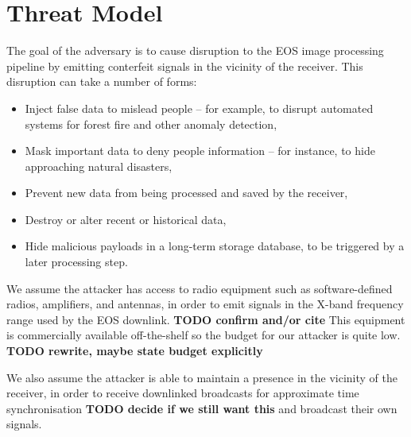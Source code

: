 \section{Threat Model}

The goal of the adversary is to cause disruption to the EOS image processing pipeline by emitting conterfeit signals in the vicinity of the receiver.
This disruption can take a number of forms:
\begin{itemize}
    \item Inject false data to mislead people -- for example, to disrupt automated systems for forest fire and other anomaly detection,
    \item Mask important data to deny people information -- for instance, to hide approaching natural disasters,
    \item Prevent new data from being processed and saved by the receiver,
    \item Destroy or alter recent or historical data,
    \item Hide malicious payloads in a long-term storage database, to be triggered by a later processing step.
\end{itemize}

We assume the attacker has access to radio equipment such as software-defined radios, amplifiers, and antennas, in order to emit signals in the X-band frequency range used by the EOS downlink.
\textbf{TODO confirm and/or cite}
This equipment is commercially available off-the-shelf so the budget for our attacker is quite low.
\textbf{TODO rewrite, maybe state budget explicitly}

We also assume the attacker is able to maintain a presence in the vicinity of the receiver, in order to receive downlinked broadcasts for approximate time synchronisation \textbf{TODO decide if we still want this} and broadcast their own signals.


